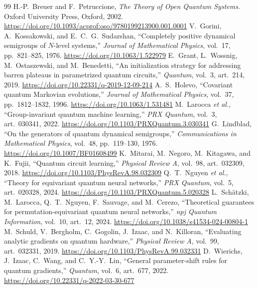 \documentclass[10pt,a4paper]{amsart}
\begin{document}
\begin{thebibliography}{99}
 H.-P.~Breuer and F.~Petruccione, \emph{The Theory of Open Quantum Systems}. Oxford University Press, Oxford, 2002. \url{https://doi.org/10.1093/acprof:oso/9780199213900.001.0001}
 V.~Gorini, A.~Kossakowski, and E.~C.~G.~Sudarshan, ``Completely positive dynamical semigroups of $N$-level systems,'' \emph{Journal of Mathematical Physics}, vol.~17, pp.~821--825, 1976. \url{https://doi.org/10.1063/1.522979}
 E.~Grant, L.~Wossnig, M.~Ostaszewski, and M.~Benedetti, ``An initialization strategy for addressing barren plateaus in parametrized quantum circuits,'' \emph{Quantum}, vol.~3, art.~214, 2019. \url{https://doi.org/10.22331/q-2019-12-09-214}
 A.~S.~Holevo, ``Covariant quantum Markovian evolutions,'' \emph{Journal of Mathematical Physics}, vol.~37, pp.~1812--1832, 1996. \url{https://doi.org/10.1063/1.531481}
 M.~Larocca \emph{et al.}, ``Group-invariant quantum machine learning,'' \emph{PRX Quantum}, vol.~3, art.~030341, 2022. \url{https://doi.org/10.1103/PRXQuantum.3.030341}
 G.~Lindblad, ``On the generators of quantum dynamical semigroups,'' \emph{Communications in Mathematical Physics}, vol.~48, pp.~119--130, 1976. \url{https://doi.org/10.1007/BF01608499}
 K.~Mitarai, M.~Negoro, M.~Kitagawa, and K.~Fujii, ``Quantum circuit learning,'' \emph{Physical Review A}, vol.~98, art.~032309, 2018. \url{https://doi.org/10.1103/PhysRevA.98.032309}
 Q.~T.~Nguyen \emph{et al.}, ``Theory for equivariant quantum neural networks,'' \emph{PRX Quantum}, vol.~5, art.~020328, 2024. \url{https://doi.org/10.1103/PRXQuantum.5.020328}
 L.~Sch\"atzki, M.~Larocca, Q.~T.~Nguyen, F.~Sauvage, and M.~Cerezo, ``Theoretical guarantees for permutation-equivariant quantum neural networks,'' \emph{npj Quantum Information}, vol.~10, art.~12, 2024. \url{https://doi.org/10.1038/s41534-024-00804-1}
 M.~Schuld, V.~Bergholm, C.~Gogolin, J.~Izaac, and N.~Killoran, ``Evaluating analytic gradients on quantum hardware,'' \emph{Physical Review A}, vol.~99, art.~032331, 2019. \url{https://doi.org/10.1103/PhysRevA.99.032331}
 D.~Wierichs, J.~Izaac, C.~Wang, and C.~Y.-Y.~Lin, ``General parameter-shift rules for quantum gradients,'' \emph{Quantum}, vol.~6, art.~677, 2022. \url{https://doi.org/10.22331/q-2022-03-30-677}
\end{thebibliography}
\end{document}
